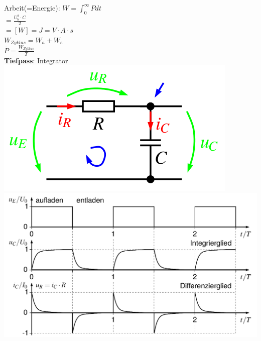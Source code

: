 \documentclass[8pt]{extarticle}
\begin{document}
\begin{minipage}{0.33\textwidth}
Arbeit(=Energie): $W = \int_0^\infty P dt$\\
\phantom{sssssssss} $= \frac{U_b^2 \cdot C}{2} $\\
\phantom{sssssssss} $= [W] = J = V \cdot A \cdot s$\\
$W_{Zyklus} = W_a + W_e$\\
$\overline{P} = \frac{W_{Zyklus}}{T}$\\
\textbf{Tiefpass}: Integrator\\
\includegraphics[scale=0.3]{tiefpass.png}\\
\includegraphics[scale=0.1]{tiefpassuit.png}
\end{minipage}%
~~~~~~~
\end{document}
